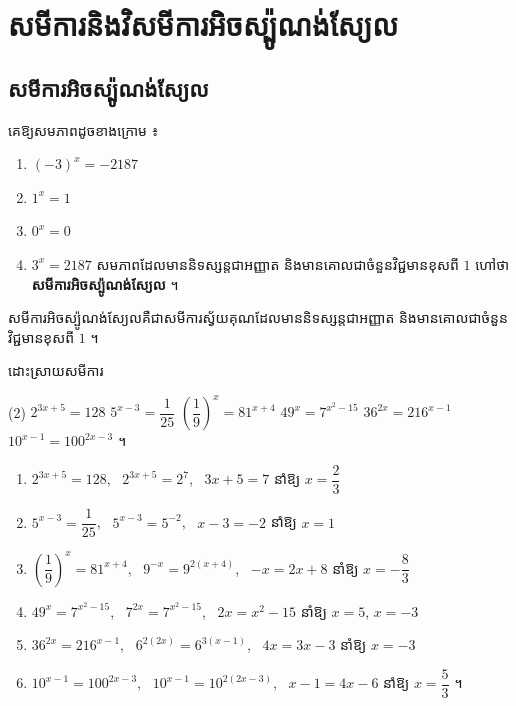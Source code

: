 \section{សមីការនិងវិសមីការអិចស្ប៉ូណង់ស្យែល}

\subsection{សមីការអិចស្ប៉ូណង់ស្យែល}

\begin{example}[ឧទាហរណ៍]
គេឱ្យសមភាពដូចខាងក្រោម ៖
\begin{enumerate}[a]
  \item $(-3)^x = -2187$
  \item $1^x = 1$
  \item $0^x = 0$
  \item $3^x = 2187$ សមភាពដែលមាននិទស្សន្តជាអញ្ញាត និងមានគោលជាចំនួនវិជ្ជមានខុសពី $1$ ហៅថា \textbf{សមីការអិចស្ប៉ូណង់ស្យែល} ។
\end{enumerate}
\end{example}

\begin{definition}
សមីការអិចស្ប៉ូណង់ស្យែលគឺជាសមីការស្វ័យគុណដែលមាននិទស្សន្តជាអញ្ញាត និងមានគោលជាចំនួនវិជ្ជមានខុសពី $1$ ។
\end{definition}

\begin{example}[លំហាត់គំរូ ២]
ដោះស្រាយសមីការ
\begin{tasks}(2)
  \task $2^{3x+5} = 128$
  \task $5^{x-3} = \dfrac{1}{25}$
  \task $\left(\dfrac{1}{9}\right)^x = 81^{x+4}$
  \task $49^x = 7^{x^2-15}$
  \task $36^{2x} = 216^{x-1}$
  \task $10^{x-1} = 100^{2x-3}$ ។
\end{tasks}
\end{example}
\ans
\begin{enumerate}[a]
  \item $2^{3x+5} = 128$, \ $2^{3x+5} = 2^7$, \ $3x + 5 = 7$ នាំឱ្យ $x = \dfrac{2}{3}$
  \item $5^{x-3} = \dfrac{1}{25}$, \ $5^{x-3} = 5^{-2}$, \ $x - 3 = -2$ នាំឱ្យ $x = 1$
  \item $\left(\dfrac{1}{9}\right)^x = 81^{x+4}$, \ $9^{-x} = 9^{2(x+4)}$, \ $-x = 2x + 8$ នាំឱ្យ $x = -\dfrac{8}{3}$
  \item $49^x = 7^{x^2-15}$, \ $7^{2x} = 7^{x^2-15}$, \ $2x = x^2 - 15$ នាំឱ្យ $x = 5$, $x = -3$
  \item $36^{2x} = 216^{x-1}$, \ $6^{2(2x)} = 6^{3(x-1)}$, \ $4x = 3x - 3$ នាំឱ្យ $x = -3$
  \item $10^{x-1} = 100^{2x-3}$, \ $10^{x-1} = 10^{2(2x-3)}$, \ $x - 1 = 4x - 6$ នាំឱ្យ $x = \dfrac{5}{3}$ ។
\end{enumerate}

